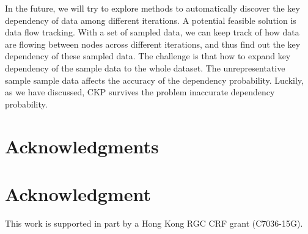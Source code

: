 \documentclass[10pt,journal,compsoc]{IEEEtran}
\begin{document}
In the future, we will try to explore methods to automatically discover the key dependency of data among different iterations. 
A potential feasible solution is data flow tracking. 
With a set of sampled data, we can keep track of how data are flowing between nodes across different iterations, and thus find out the key dependency of these sampled data. 
The challenge is that how to expand key dependency of the sample data to the whole dataset. 
The unrepresentative sample sample data affects the accuracy of the dependency probability. 
Luckily, as we have discussed, CKP survives the problem inaccurate dependency probability.


\ifCLASSOPTIONcompsoc
 \section*{Acknowledgments}
\else
 \section*{Acknowledgment}
\fi
This work is supported in part by a Hong Kong RGC CRF grant
(C7036-15G).


%
%
\end{document}
